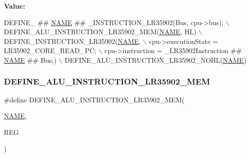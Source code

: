 {\bfseries Value\+:}
\begin{DoxyCode}
DEFINE\_ ## \mbox{\hyperlink{inflate_8h_a164ea0159d5f0b5f12a646f25f99eceaa67bc2ced260a8e43805d2480a785d312}{NAME}} ## \_INSTRUCTION\_LR35902(Bus, cpu->bus); \(\backslash\)
    DEFINE\_ALU\_INSTRUCTION\_LR35902\_MEM(\mbox{\hyperlink{inflate_8h_a164ea0159d5f0b5f12a646f25f99eceaa67bc2ced260a8e43805d2480a785d312}{NAME}}, HL) \(\backslash\)
    DEFINE\_INSTRUCTION\_LR35902(\mbox{\hyperlink{inflate_8h_a164ea0159d5f0b5f12a646f25f99eceaa67bc2ced260a8e43805d2480a785d312}{NAME}}, \(\backslash\)
        cpu->executionState = LR35902\_CORE\_READ\_PC; \(\backslash\)
        cpu->instruction = \_LR35902Instruction ## \mbox{\hyperlink{inflate_8h_a164ea0159d5f0b5f12a646f25f99eceaa67bc2ced260a8e43805d2480a785d312}{NAME}} ## Bus;) \(\backslash\)
    DEFINE\_ALU\_INSTRUCTION\_LR35902\_NOHL(\mbox{\hyperlink{inflate_8h_a164ea0159d5f0b5f12a646f25f99eceaa67bc2ced260a8e43805d2480a785d312}{NAME}})
\end{DoxyCode}
\mbox{\label{isa-lr35902_8c_a367e55ba4f90eb207e3da6fe3a1d8d5e}} 
\subsubsection{\texorpdfstring{D\+E\+F\+I\+N\+E\+\_\+\+A\+L\+U\+\_\+\+I\+N\+S\+T\+R\+U\+C\+T\+I\+O\+N\+\_\+\+L\+R35902\+\_\+\+M\+EM}{DEFINE\_ALU\_INSTRUCTION\_LR35902\_MEM}}
{\footnotesize\ttfamily \#define D\+E\+F\+I\+N\+E\+\_\+\+A\+L\+U\+\_\+\+I\+N\+S\+T\+R\+U\+C\+T\+I\+O\+N\+\_\+\+L\+R35902\+\_\+\+M\+EM(\begin{DoxyParamCaption}\item[{}]{\mbox{\hyperlink{inflate_8h_a164ea0159d5f0b5f12a646f25f99eceaa67bc2ced260a8e43805d2480a785d312}{N\+A\+ME}},  }\item[{}]{R\+EG }\end{DoxyParamCaption})}


